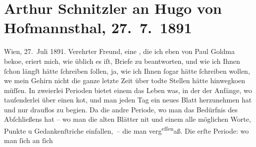                \section[Arthur Schnitzler an Hugo von Hofmannsthal, 27. 7. 1891]{ Arthur Schnitzler an Hugo von Hofmannsthal, 27. 7. 1891}\nopagebreak{}\rehead{ }\begin{ledgroupsized}[t]{13cm}\normalsize\beginnumbering{} \toendnotes[C]{\smallbreak\pagebreak[2]} 
\toendnotes[C]{\smallbreak}\pstart
           \raggedleft{}{\pb}Wien, 27. Juli
                  1891.\pend
           \pstart
           Verehrter Freund, eine \label{K_L00025-1v}\label{K_L00025-1h}, die ich eben von Paul Goldma{\geminationn} beko{\geminationm}e, eri{\geminationn}ert mich,
               wie üblich es iſt, Briefe zu beantworten, und wie ich Ihnen ſchon längſt hätte
               ſchreiben ſollen, ja, wie ich Ihnen ſogar hätte ſchreiben wollen, we{\geminationn} mein Gehirn nicht die ganze letzte Zeit über todte
               Stellen hätte hinwegko{\geminationm}en müſſen. In zweierlei Perioden
               bietet einem das Leben was, in der der Anfänge, wo tauſenderlei über einen ko{\geminationm}t, und man {\pb}jeden Tag ein
               neues Blatt herzunehmen hat und nur drauflos zu begi{\geminationn}en.
                  Da{\geminationn} die andre Periode, wo man das Bedürfnis des
               Abſchließens hat – wo man die alten Blätter ni{\geminationm}t und
               einem alle möglichen Worte, Punkte u Gedankenſtriche einfallen, – die man verg\substVorne{}\textsuperscript{eſſen}\substDazwischen{}aß\substHinten{}{ }. Die erſte Periode: wo man ſich an ſich

\end{ledgroupsized}
